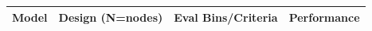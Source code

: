 \documentclass[final]{beamer}
\newlength{\colwidth}
\begin{document}
\begin{frame}[t]
\begin{columns}[t]
\begin{column}{\colwidth}
\begin{block}

      \begin{figure}
      \end{figure}
      \vspace*{-\baselineskip}
        \large{
          \begin{table}
            \centering
            \begin{tabular}{l l l l}
              \toprule
              \multicolumn{1}{|l|}{\textbf{Model}}                                                                                                         & \multicolumn{1}{|l|}{\textbf{Design (N=nodes)}} & \multicolumn{1}{|l|}{\textbf{Eval Bins/Criteria}} & \multicolumn{1}{|l|}{\textbf{Performance}} \\
              \midrule


\end{tabular}
\end{table}}
\end{block}
\end{column}
\end{columns}
\end{frame}
\end{document}
